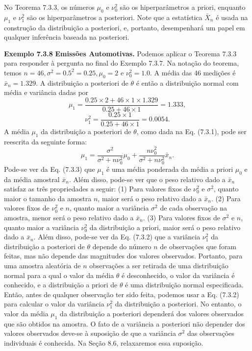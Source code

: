 \vspace{1cm}
No Teorema 7.3.3, os números $\mu_0$ e $\nu_0^2$ são os hiperparâmetros a priori, enquanto $\mu_1$ e $\nu_1^2$ são os hiperparâmetros a posteriori. Note que a estatística $\bar{X}_n$ é usada na construção da distribuição a posteriori, e, portanto, desempenhará um papel em qualquer inferência baseada na posteriori.

\vspace{1cm}
\noindent\textbf{Exemplo 7.3.8} \quad \textbf{Emissões Automotivas.} Podemos aplicar o Teorema 7.3.3 para responder à pergunta no final do Exemplo 7.3.7. Na notação do teorema, temos $n=46, \sigma^2=0.5^2=0.25, \mu_0=2$ e $\nu_0^2=1.0$. A média das 46 medições é $\bar{x}_n=1.329$. A distribuição a posteriori de $\theta$ é então a distribuição normal com média e variância dadas por
$$ \mu_1 = \frac{0.25 \times 2 + 46 \times 1 \times 1.329}{0.25+46\times 1} = 1.333, $$
$$ \nu_1^2 = \frac{0.25 \times 1}{0.25+46\times 1} = 0.0054. $$
A média $\mu_1$ da distribuição a posteriori de $\theta$, como dada na Eq. (7.3.1), pode ser reescrita da seguinte forma:
\begin{equation}
\mu_1 = \frac{\sigma^2}{\sigma^2+n\nu_0^2}\mu_0 + \frac{n\nu_0^2}{\sigma^2+n\nu_0^2}\bar{x}_n. \tag{7.3.3}
\end{equation}
Pode-se ver da Eq. (7.3.3) que $\mu_1$ é uma média ponderada da média a priori $\mu_0$ e da média amostral $\bar{x}_n$. Além disso, pode-se ver que o peso relativo dado a $\bar{x}_n$ satisfaz as três propriedades a seguir: (1) Para valores fixos de $\nu_0^2$ e $\sigma^2$, quanto maior o tamanho da amostra $n$, maior será o peso relativo dado a $\bar{x}_n$. (2) Para valores fixos de $\nu_0^2$ e $n$, quanto maior a variância $\sigma^2$ de cada observação na amostra, menor será o peso relativo dado a $\bar{x}_n$. (3) Para valores fixos de $\sigma^2$ e $n$, quanto maior a variância $\nu_0^2$ da distribuição a priori, maior será o peso relativo dado a $\bar{x}_n$.
Além disso, pode-se ver da Eq. (7.3.2) que a variância $\nu_1^2$ da distribuição a posteriori de $\theta$ depende do número $n$ de observações que foram feitas, mas não depende das magnitudes dos valores observados. Portanto, para uma amostra aleatória de $n$ observações a ser retirada de uma distribuição normal para a qual o valor da média $\theta$ é desconhecido, o valor da variância é conhecido, e a distribuição a priori de $\theta$ é uma distribuição normal especificada. Então, antes de qualquer observação ter sido feita, podemos usar a Eq. (7.3.2) para calcular o valor da variância $\nu_1^2$ da distribuição a posteriori. No entanto, o valor da média $\mu_1$ da distribuição a posteriori dependerá dos valores observados que são obtidos na amostra. O fato de a variância a posteriori não depender dos valores observados deve-se à suposição de que a variância $\sigma^2$ das observações individuais é conhecida. Na Seção 8.6, relaxaremos essa suposição.

